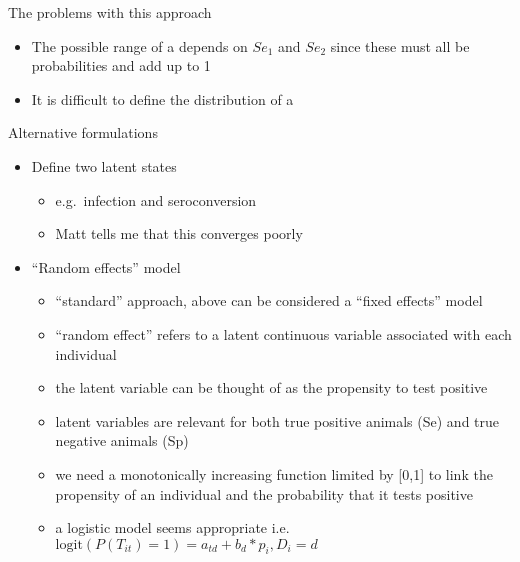 \documentclass[
  ignorenonframetext,
]{beamer}
\providecommand{\tightlist}{%
  \setlength{\itemsep}{0pt}\setlength{\parskip}{0pt}}
\begin{document}
\begin{frame}{The problems with this approach}
\protect\hypertarget{the-problems-with-this-approach}{}
\begin{itemize}
\tightlist
\item
  The possible range of a depends on \(Se_1\) and \(Se_2\) since these
  must all be probabilities and add up to 1
\item
  It is difficult to define the distribution of a
\end{itemize}
\end{frame}

\begin{frame}{Alternative formulations}
\protect\hypertarget{alternative-formulations}{}
\begin{itemize}
\tightlist
\item
  Define two latent states

  \begin{itemize}
  \tightlist
  \item
    e.g.~infection and seroconversion
  \item
    Matt tells me that this converges poorly
  \end{itemize}
\item
  ``Random effects'' model

  \begin{itemize}
  \tightlist
  \item
    ``standard'' approach, above can be considered a ``fixed effects''
    model
  \item
    ``random effect'' refers to a latent continuous variable associated
    with each individual
  \item
    the latent variable can be thought of as the propensity to test
    positive
  \item
    latent variables are relevant for both true positive animals (Se)
    and true negative animals (Sp)
  \item
    we need a monotonically increasing function limited by {[}0,1{]} to
    link the propensity of an individual and the probability that it
    tests positive
  \item
    a logistic model seems appropriate
    i.e.~\(\mathrm{logit}(P(T_{it}) = 1) = a_{td} + b_{d}*p_i, D_i=d\)


\end{itemize}
\end{itemize}
\end{frame}
\end{document}
